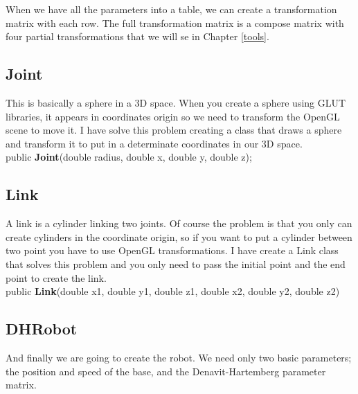 \documentclass[12pt,a4paper,oneside,english]{book}
\begin{document}
When we have all the parameters into a table, we can create a transformation matrix with each row. The full transformation matrix is a compose matrix with four partial transformations that we will se in Chapter \ref{tools}.

\subsection{Joint}

This is basically a sphere in a 3D space. When you create a sphere using GLUT libraries, it appears in coordinates origin so we need to transform the OpenGL scene to move it. I have solve this problem creating a class that draws a sphere and transform it to put in a determinate coordinates in our 3D space.\\

\noindent
\textcolor[rgb]{0.00,0.00,1.00}{public} \textbf{Joint}(\textcolor[rgb]{0.00,0.00,1.00}{double} radius, \textcolor[rgb]{0.00,0.00,1.00}{double} x, \textcolor[rgb]{0.00,0.00,1.00}{double} y, \textcolor[rgb]{0.00,0.00,1.00}{double} z);

\subsection{Link}

A link is a cylinder linking two joints. Of course the problem is that you only can create cylinders in the coordinate origin, so if you want to put a cylinder between two point you have to use OpenGL transformations. I have create a Link class that solves this problem and you only need to pass the initial point and the end point to create the link.\\

\noindent
\textcolor[rgb]{0.00,0.00,1.00}{public} \textbf{Link}(\textcolor[rgb]{0.00,0.00,1.00}{double} x1, \textcolor[rgb]{0.00,0.00,1.00}{double} y1, \textcolor[rgb]{0.00,0.00,1.00}{double} z1, \textcolor[rgb]{0.00,0.00,1.00}{double} x2, \textcolor[rgb]{0.00,0.00,1.00}{double} y2, \textcolor[rgb]{0.00,0.00,1.00}{double} z2)

\subsection{DHRobot}

And finally we are going to create the robot. We need only two basic parameters; the position and speed of the base, and the Denavit-Hartemberg parameter matrix.\\
\end{document}
